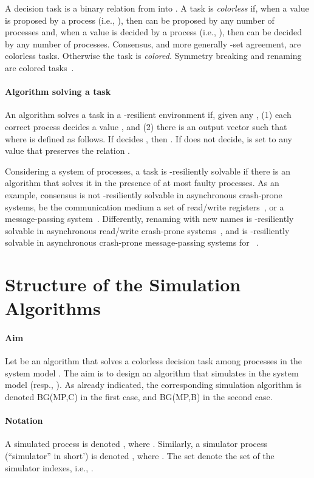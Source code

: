 \documentclass[11pt,letterpaper]{article}
\begin{document}
A decision task is a binary relation  from  into .
A task is {\it colorless} if,  
when a value   is proposed by a process
 (i.e., ), then  can be proposed by any number of processes and,
when a value   is decided by a process
 (i.e., ), then  can be decided by any number of processes.
Consensus, and more generally -set agreement, are colorless tasks.
Otherwise the task is  {\it colored}.  Symmetry breaking and renaming are
colored tasks~\cite{ABDPR90,CRR11,IRR11}.


\paragraph{Algorithm solving a task}
An algorithm solves a task in a -resilient  environment if, given
any , (1)  each correct process   decides a value ,
 and (2) there is an output vector  such that
 where  is defined as follows.
If  decides , then  .
If  does not decide,  is set to any  value  that preserves
the relation .


Considering a system of  processes, a
task  is  -resiliently solvable if there is  an
algorithm that solves  it in the presence of at most  faulty processes.
As an example, consensus is  not  -resiliently solvable
in asynchronous crash-prone systems, be the communication medium a set of
read/write registers~\cite{LA87}, or a message-passing  system~\cite{FLP85}.
Differently,  renaming  with  new names is -resiliently solvable
in asynchronous read/write crash-prone systems~\cite{CR12,HS99}, and
is -resiliently solvable in asynchronous crash-prone message-passing
systems for ~\cite{ABDPR90}.




\section{Structure of the Simulation Algorithms}
\label{sec:simu-structure}

\paragraph{Aim}
Let  be an algorithm that solves a colorless decision task among 
processes in the  system model  . The aim is to design an algorithm that simulates  in the
system model    (resp.,  ).
As already indicated, the corresponding simulation algorithm is denoted
BG(MP,C) in the first case, and BG(MP,B) in the second case.


\paragraph{Notation}
A simulated process is denoted , where .
Similarly, a simulator process (``simulator'' in short') is  denoted ,
where .
The set  denote the set of the simulator indexes,
i.e., .
\end{document}
